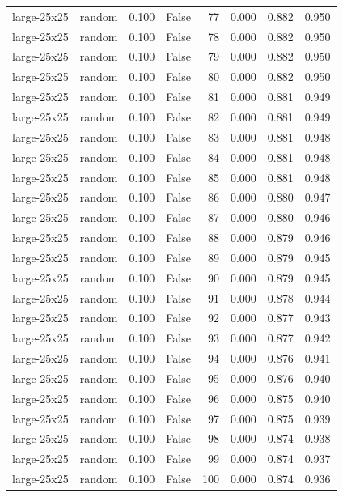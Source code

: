 \begin{tabular}{llrrrrrr}
large-25x25 & random & 0.100 & False & 77 & 0.000 & 0.882 & 0.950 \\
large-25x25 & random & 0.100 & False & 78 & 0.000 & 0.882 & 0.950 \\
large-25x25 & random & 0.100 & False & 79 & 0.000 & 0.882 & 0.950 \\
large-25x25 & random & 0.100 & False & 80 & 0.000 & 0.882 & 0.950 \\
large-25x25 & random & 0.100 & False & 81 & 0.000 & 0.881 & 0.949 \\
large-25x25 & random & 0.100 & False & 82 & 0.000 & 0.881 & 0.949 \\
large-25x25 & random & 0.100 & False & 83 & 0.000 & 0.881 & 0.948 \\
large-25x25 & random & 0.100 & False & 84 & 0.000 & 0.881 & 0.948 \\
large-25x25 & random & 0.100 & False & 85 & 0.000 & 0.881 & 0.948 \\
large-25x25 & random & 0.100 & False & 86 & 0.000 & 0.880 & 0.947 \\
large-25x25 & random & 0.100 & False & 87 & 0.000 & 0.880 & 0.946 \\
large-25x25 & random & 0.100 & False & 88 & 0.000 & 0.879 & 0.946 \\
large-25x25 & random & 0.100 & False & 89 & 0.000 & 0.879 & 0.945 \\
large-25x25 & random & 0.100 & False & 90 & 0.000 & 0.879 & 0.945 \\
large-25x25 & random & 0.100 & False & 91 & 0.000 & 0.878 & 0.944 \\
large-25x25 & random & 0.100 & False & 92 & 0.000 & 0.877 & 0.943 \\
large-25x25 & random & 0.100 & False & 93 & 0.000 & 0.877 & 0.942 \\
large-25x25 & random & 0.100 & False & 94 & 0.000 & 0.876 & 0.941 \\
large-25x25 & random & 0.100 & False & 95 & 0.000 & 0.876 & 0.940 \\
large-25x25 & random & 0.100 & False & 96 & 0.000 & 0.875 & 0.940 \\
large-25x25 & random & 0.100 & False & 97 & 0.000 & 0.875 & 0.939 \\
large-25x25 & random & 0.100 & False & 98 & 0.000 & 0.874 & 0.938 \\
large-25x25 & random & 0.100 & False & 99 & 0.000 & 0.874 & 0.937 \\
large-25x25 & random & 0.100 & False & 100 & 0.000 & 0.874 & 0.936 \\

\end{tabular}
